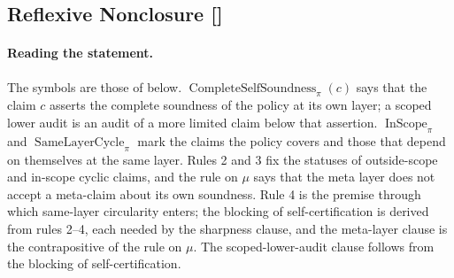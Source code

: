 \subsection{Reflexive Nonclosure [\texorpdfstring{}{F21}]}\label{sec:status-records-coherence:reflexive-nonclosure}

\paragraph{Reading the statement.} The symbols are those of  below.
\(\operatorname{CompleteSelfSoundness}_{\pi}(c)\) says that the claim
\(c\) asserts the complete soundness of the policy at its own layer; a
scoped lower audit is an audit of a more limited claim below that
assertion. \(\operatorname{InScope}_{\pi}\) and
\(\operatorname{SameLayerCycle}_{\pi}\) mark the claims the policy
covers and those that depend on themselves at the same layer. Rules 2 and 3 fix the statuses of outside-scope and in-scope cyclic claims, and the rule on \(\mu\)
says that the meta layer does not accept a meta-claim about its own
soundness. Rule 4 is the premise through which same-layer circularity enters;
the blocking of self-certification is derived from rules 2--4, each needed by
the sharpness clause, and the meta-layer clause is the contrapositive of the
rule on \(\mu\). The scoped-lower-audit clause follows from the blocking of self-certification.


